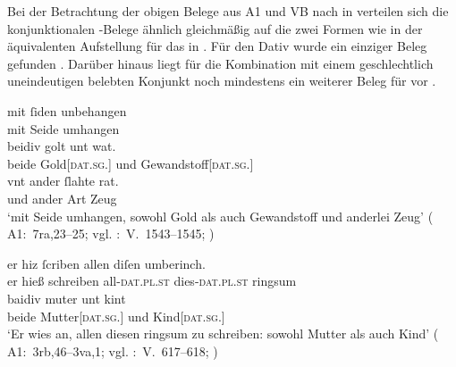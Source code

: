 Bei der Betrachtung der obigen Belege aus A1 und VB nach
 in  verteilen sich die
konjunktionalen -Belege ähnlich gleichmäßig auf die zwei Formen wie
in der äquivalenten Aufstellung für das \CAO{} in
. Für den Dativ wurde ein einziger Beleg
gefunden . Darüber hinaus liegt für die Kombination mit einem
geschlechtlich uneindeutigen belebten Konjunkt noch
mindestens ein weiterer Beleg für  vor .

\begin{exe}
\ex \label{ex:datregul}
	\gll mit ſiden unbehangen \\
		mit Seide umhangen \\
\sn \gll beidiv golt unt wat. \\
		beide Gold[\textsc{dat.sg.\NeutI}] und Gewandstoff[\textsc{dat.sg.\FemI}] \\
\sn \gll vnt ander ſlahte rat. \\
		und ander Art Zeug \\
	\trans `mit Seide umhangen, sowohl Gold als auch Gewandstoff und
		anderlei Zeug'
		(%
			A1:~7ra,23--25; vgl.
			\KC:~V.~1543--1545;
			\cite[109]{schroeder1895}%
		)

\ex \label{ex:datextra}
		\gll er hiz ſcriben allen diſen umberinch. \\
			er hieß schreiben all-\textsc{dat.pl.st} dies-\textsc{dat.pl.st} ringsum \\
	\sn \gll baidiv muter unt kint \\
			beide Mutter[\textsc{dat.sg.\FemF}] und Kind[\textsc{dat.sg.\NeutA}] \\
		\trans `Er wies an, allen diesen ringsum zu schreiben: sowohl
			Mutter als auch Kind'
			(%
				A1:~3rb,46--3va,1; vgl.
				\KC:~V.~617--618;
				\cite[92]{schroeder1895}%
			)

\end{exe}

